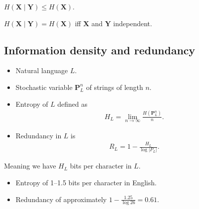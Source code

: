 \documentclass{beamer}
\let\stoch\mathbf{}
\begin{document}
\begin{frame}
  \begin{corollary}
    \(H(\stoch X\mid \stoch Y) \leq H(\stoch X)\).
  \end{corollary}

  \begin{corollary}
    \(H(\stoch X\mid \stoch Y) = H(\stoch X)\) iff \(\stoch X\) and \(\stoch 
      Y\) independent.
  \end{corollary}
\end{frame}
%
%

\subsection{Information density and redundancy}

\begin{frame}
  \begin{definition}
    \begin{itemize}
      \item Natural language \(L\).
      \item Stochastic variable \(\stoch P^n_L\) of strings of length \(n\).
      \item Entropy of \(L\) defined as
        \begin{align*}
          H_L = \lim_{n\to \infty}\frac{H(\stoch P^n_L)}{n}.
        \end{align*}
      \item Redundancy in \(L\) is
        \begin{align*}
          R_L = 1 - \frac{H_L}{\log |P_L|}.
        \end{align*}
    \end{itemize}
  \end{definition}
\end{frame}

\begin{frame}
  \begin{remark}
    Meaning we have \(H_L\) bits per character in \(L\).
  \end{remark}

  \begin{example}
    \begin{itemize}
      \item Entropy of 1--1.5 bits per character in English.
      \item Redundancy of approximately \(1 - \frac{1.25}{\log 26} = 0.61\).
    \end{itemize}
  \end{example}

\end{frame}
\end{document}

